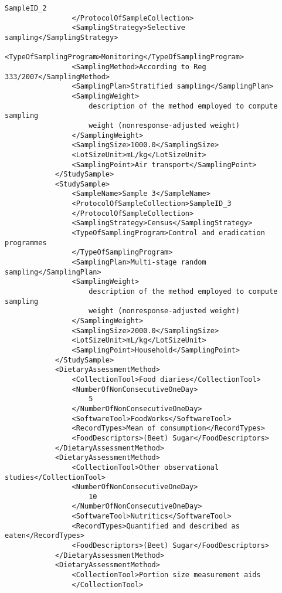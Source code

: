 \documentclass[a4paper]{report}
\begin{document}
\begin{lstlisting}[language=RAKIP, caption={Example of StudySample}]
                    SampleID_2
                </ProtocolOfSampleCollection>
                <SamplingStrategy>Selective sampling</SamplingStrategy>
                <TypeOfSamplingProgram>Monitoring</TypeOfSamplingProgram>
                <SamplingMethod>According to Reg 333/2007</SamplingMethod>
                <SamplingPlan>Stratified sampling</SamplingPlan>
                <SamplingWeight>
                    description of the method employed to compute sampling
                    weight (nonresponse-adjusted weight)
                </SamplingWeight>
                <SamplingSize>1000.0</SamplingSize>
                <LotSizeUnit>mL/kg</LotSizeUnit>
                <SamplingPoint>Air transport</SamplingPoint>
            </StudySample>
            <StudySample>
                <SampleName>Sample 3</SampleName>
                <ProtocolOfSampleCollection>SampleID_3
                </ProtocolOfSampleCollection>
                <SamplingStrategy>Census</SamplingStrategy>
                <TypeOfSamplingProgram>Control and eradication programmes
                </TypeOfSamplingProgram>
                <SamplingPlan>Multi-stage random sampling</SamplingPlan>
                <SamplingWeight>
                    description of the method employed to compute sampling
                    weight (nonresponse-adjusted weight)
                </SamplingWeight>
                <SamplingSize>2000.0</SamplingSize>
                <LotSizeUnit>mL/kg</LotSizeUnit>
                <SamplingPoint>Household</SamplingPoint>
            </StudySample>
            <DietaryAssessmentMethod>
                <CollectionTool>Food diaries</CollectionTool>
                <NumberOfNonConsecutiveOneDay>
                    5
                </NumberOfNonConsecutiveOneDay>
                <SoftwareTool>FoodWorks</SoftwareTool>
                <RecordTypes>Mean of consumption</RecordTypes>
                <FoodDescriptors>(Beet) Sugar</FoodDescriptors>
            </DietaryAssessmentMethod>
            <DietaryAssessmentMethod>
                <CollectionTool>Other observational studies</CollectionTool>
                <NumberOfNonConsecutiveOneDay>
                    10
                </NumberOfNonConsecutiveOneDay>
                <SoftwareTool>Nutritics</SoftwareTool>
                <RecordTypes>Quantified and described as eaten</RecordTypes>
                <FoodDescriptors>(Beet) Sugar</FoodDescriptors>
            </DietaryAssessmentMethod>
            <DietaryAssessmentMethod>
                <CollectionTool>Portion size measurement aids
                </CollectionTool>

\end{lstlisting}
\end{document}
